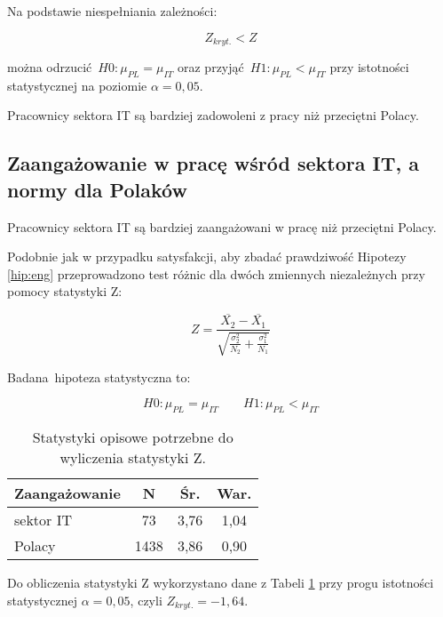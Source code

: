 Na podstawie niespełniania zależności:

\begin{equation}
  Z_{kryt.} < Z
\end{equation}

można odrzucić $H0: \mu_{PL} = \mu_{IT}$ oraz przyjąć $H1: \mu_{PL} < \mu_{IT}$ przy istotności statystycznej na poziomie $\alpha = 0,05$.

Pracownicy sektora IT są bardziej zadowoleni z pracy niż przeciętni Polacy.

\subsection{Zaangażowanie w pracę wśród sektora IT, a normy dla Polaków}
\begin{hyp}
  Pracownicy sektora IT są bardziej zaangażowani w pracę niż przeciętni Polacy.
  \label{hip:eng}
\end{hyp}

Podobnie jak w przypadku satysfakcji, aby zbadać prawdziwość Hipotezy \ref{hip:eng} przeprowadzono test różnic dla dwóch zmiennych niezależnych przy pomocy statystyki Z:

\begin{equation}
  Z = \frac{\overline{X_2} - \overline{X_1}}{\sqrt{\frac{\sigma^2_2}{N_2}+\frac{\sigma^2_1}{N_1}}}
\end{equation}

Badana hipoteza statystyczna  to:

\begin{equation}
  H0: \mu_{PL} = \mu_{IT} \qquad H1: \mu_{PL} < \mu_{IT}
\end{equation}

\begin{table}[h!b]
  \begin{center}
    \begin{tabular}{l | c c c }
      Zaangażowanie & N & Śr. & War. \\ \hline
      sektor IT & 73 & 3,76 & 1,04 \\
      Polacy & 1438 & 3,86 & 0,90 \\
    \end{tabular}
  \end{center}
  \caption{Statystyki opisowe potrzebne do wyliczenia statystyki Z.}
  \label{tab:uwes-norms-data}
\end{table}

Do obliczenia statystyki Z wykorzystano dane z Tabeli \ref{tab:uwes-norms-data} przy progu istotności statystycznej $\alpha = 0,05$, czyli $Z_{kryt.} = -1,64$.

